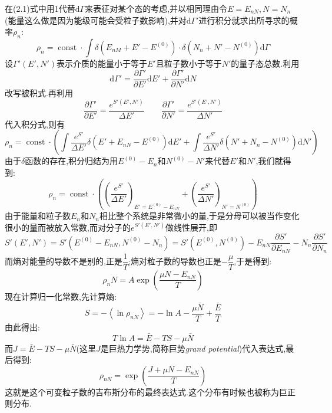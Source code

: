在(2.1)式中用1代替$\mathrm{d} \Gamma$来表征对某个态的考虑,并以相同理由令$E=E_{nN},N=N_n$(能量这么做是因为能级可能会受粒子数影响),并对$\mathrm{d} \Gamma'$进行积分就求出所寻求的概率$\rho_n$:
\begin{equation}
  \rho_n=\operatorname{const}\cdot \int \delta(E_{nM}+E'-E^{(0)})\cdot \delta(N_n+N'-N^{(0)})\mathrm{d}\Gamma
\end{equation}
设$\Gamma'(E',N')$表示介质的能量小于等于$E'$且粒子数小于等于$N'$的量子态总数.利用
\[\mathrm{d} \Gamma'=\dfrac{\partial \Gamma'}{\partial E'}\mathrm{d} E'+\dfrac{\partial \Gamma'}{\partial N'}\mathrm{d} N\]
改写被积式.再利用
\[\dfrac{\partial \Gamma'}{\partial E'}=\dfrac{e^{S'(E',N')}}{\Delta E'}\qquad\dfrac{\partial \Gamma'}{\partial N'}=\dfrac{e^{S'(E',N')}}{\Delta N'}\]
代入积分式,则有
\begin{equation}
  \rho_n=\operatorname{const}\cdot\left( \int\dfrac{e^{S'}}{\Delta E'}\delta(E'+E_{nN}-E^{(0)})\mathrm{d} E'+\int\dfrac{e^{S'}}{\Delta N'}\delta(N'+N_n-N^{(0)})\mathrm{d} N' \right) 
\end{equation}
由于$\delta$函数的存在,积分归结为用$E^{(0)}-E_n$和$N^{(0)}-N'$来代替$E'$和$N'$,我们就得到:
\begin{equation}
  \rho_n=\operatorname{const}\cdot\left( \left( \dfrac{e^{S'}}{\Delta E'} \right) _{E'=E^{(0)}-E_{nN}}+\left( \dfrac{e^{S'}}{\Delta N'} \right) _{N'=N^{(0)}} \right) 
\end{equation}
由于能量和粒子数$E_n$和$N_n$相比整个系统是非常微小的量,于是分母可以被当作变化很小的量而被放入常数,而对分子的$e^{S'(E',N')}$做线性展开,即
\begin{equation}
    S'(E',N')=S'(E^{(0)}-E_{nN},N^{(0)}-N_n)=S'(E^{(0)},N^{(0)})-E_{nN} \dfrac{\partial S'}{\partial E_{nN}}-N_n\dfrac{\partial S'}{\partial N_n}
\end{equation}
而熵对能量的导数不是别的,正是$\dfrac{1}{T}$;熵对粒子数的导数也正是$-\dfrac{\mu}{T}$,于是得到:
\begin{equation}
    \rho_nN=A\exp(\dfrac{\mu N-E_{nN}}{T})
\end{equation}
现在计算归一化常数,先计算熵:
\[S=- \left< \ln\rho_{nN} \right> =-\ln A -\dfrac{\mu \bar{N}}{T}+\dfrac{\bar{E}}{T} \]
由此得出:
\[T \ln A= \bar{E} - TS - \mu \bar{N}\]
而$J=\bar{E}-TS -\mu \bar{N}$(这里$J$是巨热力学势,简称巨势\emph{grand potential})代入表达式,最后得到:
\begin{equation}
  \rho_{nN}=\exp(\dfrac{J +\mu N -E_{nN}}{T})
\end{equation}
这就是这个可变粒子数的吉布斯分布的最终表达式.这个分布有时候也被称为巨正则分布.

